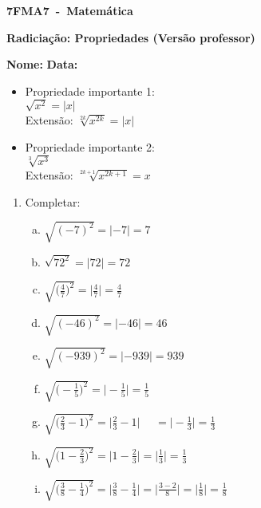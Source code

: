 \documentclass[a4paper,14pt]{article}
\begin{document}
	
	\noindent\textbf{7FMA7~-~Matemática} 
	
	\begin{center}
		\textbf{Radiciação: Propriedades (Versão professor)}
	\end{center}
	
	
	\noindent\textbf{Nome:} \underline{\hspace{10cm}}
    \noindent\textbf{Data:} \underline{\hspace{4cm}}
	
	
	\begin{multicols}{2}
    \begin{itemize}
    	\item Propriedade importante 1: \\
    	$\sqrt{x^2} = |x|$ \\
    	Extensão: $ \sqrt[2k]{x^{2k}} = |x|$ \\
    	\item Propriedade importante 2: \\
    	$\sqrt[3]{x^3}$ \\
    	Extensão: $\sqrt[{2k + 1}]{x^{2k + 1}} = x$
    \end{itemize}
	\begin{enumerate}
		
		\item Completar:
		\begin{enumerate}[a)]
			\item $\sqrt{(-7)^2} = |-7| = 7$
			\item $\sqrt{72^2} = |72| = 72$
			\item $\sqrt{\bigg(\frac{4}{7}\bigg)^2} = \bigg| \frac{4}{7} \bigg| = \frac{4}{7}$
			\item $\sqrt{(-46)^2} = |-46| = 46$
			\item $\sqrt{(-939)^2} = |-939| = 939$
			\item $\sqrt{\bigg(-\frac{1}{5}\bigg)^2} = \bigg|-\frac{1}{5} \bigg| = \frac{1}{5}$
			\item $\sqrt{\bigg(\frac{2}{3}-1\bigg)^2} = \bigg| \frac{2}{3}-1 \bigg| ~~~~~~= \bigg| -\frac{1}{3} \bigg| = \frac{1}{3}$
			\item $\sqrt{\bigg(1-\frac{2}{3}\bigg)^2} = \bigg| 1 - \frac{2}{3}\bigg| = \bigg| \frac{1}{3} \bigg| = \frac{1}{3}$ 
			\item $\sqrt{\bigg(\frac{3}{8} - \frac{1}{4}\bigg)^2} = \bigg| \frac{3}{8} - \frac{1}{4} \bigg| = \bigg| \frac{3-2}{8} \bigg| = \bigg| \frac{1}{8} \bigg| = \frac{1}{8}$
			

\end{enumerate}
\end{enumerate}
\end{multicols}
\end{document}

